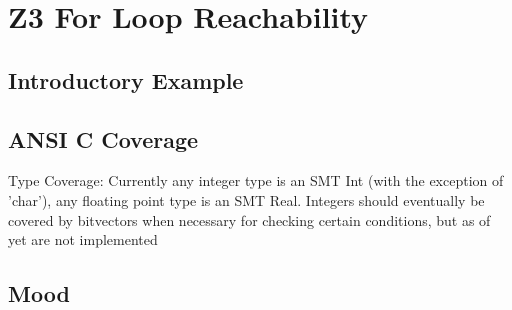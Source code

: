 \documentclass[12pt]{article}
\begin{document}
\section*{Z3 For Loop Reachability}


\subsection*{Introductory Example}

\subsection*{ANSI C Coverage}

Type Coverage:
Currently any integer type is an SMT Int (with the exception of 'char'), any floating point type is an SMT Real. Integers should eventually be covered by bitvectors when necessary for checking certain conditions, but as of yet are not implemented


	

\subsection*{Mood}
\end{document}
